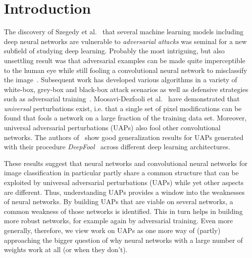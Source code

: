 \documentclass[runningheads]{llncs}
\begin{document}
\section{Introduction}
The discovery of Szegedy et al.~\cite{Szegedy_2014} that several machine learning models including deep neural networks are vulnerable to \emph{adversarial attacks} was seminal for a new subfield of studying deep learning. Probably the most intriguing, but also unsettling result was that adversarial examples can be made quite imperceptible to the human eye while still fooling a convolutional neural network to misclassify the image~\cite{goodfellow_2014}. Subsequent work has developed various algorithms in a variety of white-box, grey-box and black-box attack scenarios as well as defensive strategies such as adversarial training~\cite{REN2020346}. 
Moosavi-Dezfooli et al.~\cite{moosavidezfooli_universal_2017,moosavi-dezfooli_deepfool_2016} have demonstrated that \emph{universal} perturbations exist, i.e. that a single set of pixel modifications can be found that fools a network on a large fraction of the training data set. Moreover, universal adversarial perturbations (UAPs) also fool other convolutional networks. The authors of~\cite{moosavidezfooli_universal_2017,moosavi-dezfooli_deepfool_2016} show good generalization results for UAPs generated with their procedure \emph{DeepFool}~\cite{moosavi-dezfooli_deepfool_2016} across different deep learning architectures.  

These results suggest that neural networks and convolutional neural networks for image classification in particular partly share a common structure that can be exploited by universal adversarial perturbations (UAPs) while yet other aspects are different. Thus, understanding UAPs provides a window into the weaknesses of neural networks. By building UAPs that are viable on several networks, a common weakness of those networks is identified. This in turn helps in building more robust networks, for example again by adversarial training. Even more generally, therefore, we view work on UAPs as one more way of (partly) approaching the bigger question of why neural networks with a large number of weights work at all (or when they don't).
\end{document}
